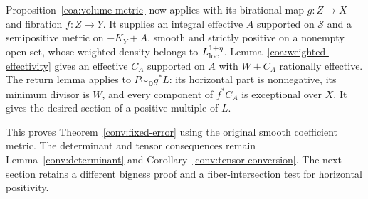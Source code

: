 Proposition~\ref{coa:volume-metric} now applies with its birational
map $g:Z\to X$ and fibration $f:Z\to Y$.  It supplies an integral
effective $A$ supported on $\mathcal S$ and a semipositive metric
on $-K_Y+A$, smooth and strictly positive on a nonempty open set,
whose weighted density belongs to $L^{1+\eta}_{\rm loc}$.
Lemma~\ref{coa:weighted-effectivity} gives an effective $C_A$
supported on $A$ with $W+C_A$ rationally effective.
The return lemma applies to $P\sim_{\mathbb Q}g^*L$: its horizontal
part is nonnegative, its minimum divisor is $W$, and every component
of $f^*C_A$ is exceptional over $X$.  It gives the desired section
of a positive multiple of $L$.

This proves Theorem~\ref{conv:fixed-error} using the original smooth
coefficient metric.  The determinant and tensor consequences remain
Lemma~\ref{conv:determinant} and Corollary~\ref{conv:tensor-conversion}.
The next section retains a different bigness proof and a
fiber-intersection test for horizontal positivity.
